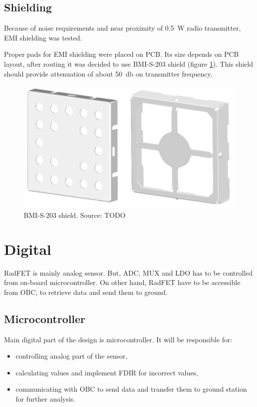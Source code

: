    \subsection{Shielding}
        Because of noise requirements and near proximity of \SI{0.5}{\watt} radio transmitter, EMI shielding was tested.

        Proper pads for EMI shielding were placed on PCB. Its size depends on PCB layout, after routing it was decided to use BMI-S-203 shield (figure \ref{BMI-S-203}). This shield should provide attenuation of about \SI{50}{\decibel} on transmitter frequency.

        \begin{figure}[H]
            \centering
            \includegraphics[width=0.7\paperwidth]{img/06/BMI-S-203.eps}
            \caption{BMI-S-203 shield. Source: TODO}
            \label{BMI-S-203}
        \end{figure}


\section{Digital}
    RadFET is mainly analog sensor. But, ADC, MUX and LDO has to be controlled from on-board microcontroller. On other hand, RadFET have to be accessible from OBC, to retrieve data and send them to ground.

    \subsection{Microcontroller}
        Main digital part of the design is microcontroller. It will be responsible for:
        \begin{itemize}
            \item controlling analog part of the sensor,
            \item calculating values and implement FDIR for incorrect values,
            \item communicating with OBC to send data and transfer them to ground station for further analysis.
        \end{itemize}

